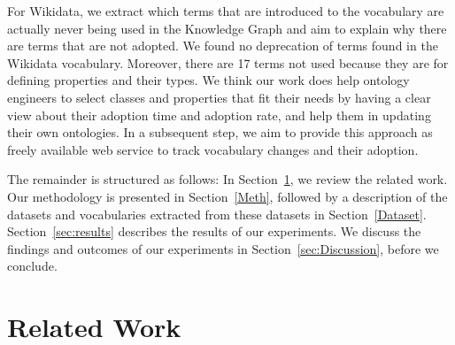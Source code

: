 %
%
For Wikidata, we extract which terms that are introduced to the vocabulary are actually never being used in the Knowledge Graph and aim to explain why there are terms that are not adopted. 
We found no deprecation of terms found in the Wikidata vocabulary. 
Moreover, there are 17 terms not used because they are for defining properties and their types.
%
We think our work does help ontology engineers to select classes and properties that fit their needs by having a clear view about their adoption time and adoption rate, and help them in updating their own ontologies. 
In a subsequent step, we aim to provide this approach as freely available web service to track vocabulary changes and their adoption.

The remainder is structured as follows: 
In Section~\ref{RW}, we review the related work. 
Our methodology is presented in Section~\ref{Meth}, followed by a description of the datasets and vocabularies extracted from these datasets in Section~\ref{Dataset}.
Section~\ref{sec:results} describes the results of our experiments.
We discuss the findings and outcomes of our experiments in Section~\ref{sec:Discussion}, before we conclude.

\section{Related Work}
\label{RW}

